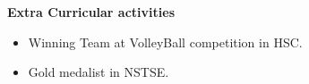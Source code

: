 \colorbox{titleColor}{\parbox{6.7in}{\textbf{Extra Curricular activities}}}
\begin{itemize}
    \setlength{\itemsep}{1pt}
    \item Winning Team at VolleyBall competition in HSC.
    \item Gold medalist in NSTSE.
\end{itemize}